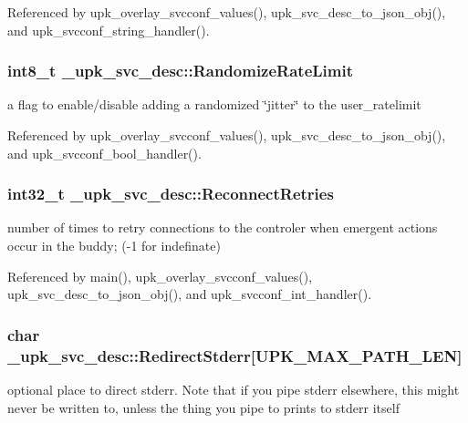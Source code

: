Referenced by upk\_\-overlay\_\-svcconf\_\-values(), upk\_\-svc\_\-desc\_\-to\_\-json\_\-obj(), and upk\_\-svcconf\_\-string\_\-handler().

\subsubsection[{RandomizeRateLimit}]{\setlength{\rightskip}{0pt plus 5cm}int8\_\-t {\bf \_\-upk\_\-svc\_\-desc::RandomizeRateLimit}}\label{struct__upk__svc__desc_af203541b3c86af36abe8f91e4a1df8bf}
a flag to enable/disable adding a randomized \char`\"{}jitter\char`\"{} to the user\_\-ratelimit 

Referenced by upk\_\-overlay\_\-svcconf\_\-values(), upk\_\-svc\_\-desc\_\-to\_\-json\_\-obj(), and upk\_\-svcconf\_\-bool\_\-handler().

\subsubsection[{ReconnectRetries}]{\setlength{\rightskip}{0pt plus 5cm}int32\_\-t {\bf \_\-upk\_\-svc\_\-desc::ReconnectRetries}}\label{struct__upk__svc__desc_a60cd2b44fbc61ec4d657e896fd9de6e8}
number of times to retry connections to the controler when emergent actions occur in the buddy; (-\/1 for indefinate) 

Referenced by main(), upk\_\-overlay\_\-svcconf\_\-values(), upk\_\-svc\_\-desc\_\-to\_\-json\_\-obj(), and upk\_\-svcconf\_\-int\_\-handler().

\subsubsection[{RedirectStderr}]{\setlength{\rightskip}{0pt plus 5cm}char {\bf \_\-upk\_\-svc\_\-desc::RedirectStderr}[UPK\_\-MAX\_\-PATH\_\-LEN]}\label{struct__upk__svc__desc_aac20b2e862d46edd03dd2efc4b469ad6}
optional place to direct stderr. Note that if you pipe stderr elsewhere, this might never be written to, unless the thing you pipe to prints to stderr itself 

